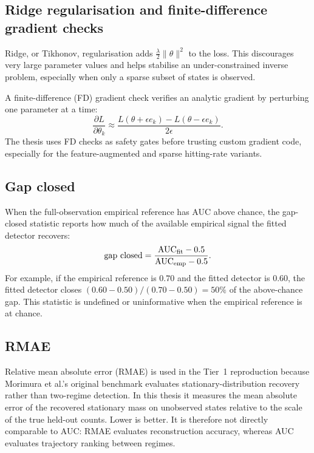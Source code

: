 \subsection{Ridge regularisation and finite-difference gradient checks}
\label{app:regularisation-fd-primer}

Ridge, or Tikhonov, regularisation adds
$\frac{\lambda}{2}\|\theta\|^2$ to the loss. This discourages very large
parameter values and helps stabilise an under-constrained inverse
problem, especially when only a sparse subset of states is observed.

A finite-difference (FD) gradient check verifies an analytic gradient by
perturbing one parameter at a time:
\[
\frac{\partial L}{\partial \theta_k}
\approx
\frac{L(\theta+\epsilon e_k)-L(\theta-\epsilon e_k)}{2\epsilon}.
\]
The thesis uses FD checks as safety gates before trusting custom
gradient code, especially for the feature-augmented and sparse
hitting-rate variants.

\subsection{Gap closed}
\label{app:gap-closed-primer}

When the full-observation empirical reference has AUC above chance, the
gap-closed statistic reports how much of the available empirical signal
the fitted detector recovers:
\[
\mathrm{gap\ closed} =
\frac{\mathrm{AUC}_{\mathrm{fit}}-0.5}
{\mathrm{AUC}_{\mathrm{emp}}-0.5}.
\]
For example, if the empirical reference is $0.70$ and the fitted detector
is $0.60$, the fitted detector closes $(0.60-0.50)/(0.70-0.50)=50\%$ of
the above-chance gap. This statistic is undefined or uninformative when
the empirical reference is at chance.

\subsection{RMAE}
\label{app:rmae-primer}

Relative mean absolute error (RMAE) is used in the Tier~1 reproduction
because Morimura et al.'s original benchmark evaluates
stationary-distribution recovery rather than two-regime detection. In this
thesis it measures the
mean absolute error of the recovered stationary mass on unobserved states
relative to the scale of the true held-out counts. Lower is better. It is
therefore not directly comparable to AUC: RMAE evaluates reconstruction
accuracy, whereas AUC evaluates trajectory ranking between regimes.
